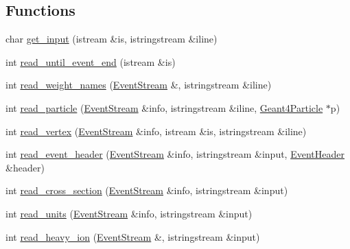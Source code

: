\subsection*{Functions}
\begin{DoxyCompactItemize}
\item 
char \hyperlink{namespace_d_d4hep_1_1_simulation_1_1_hep_m_c_ae12e8ca37b7071f67c1810fa9420acad}{get\_\-input} (istream \&is, istringstream \&iline)
\item 
int \hyperlink{namespace_d_d4hep_1_1_simulation_1_1_hep_m_c_a433e938fb3dfef8ae2590fa16cdb2229}{read\_\-until\_\-event\_\-end} (istream \&is)
\item 
int \hyperlink{namespace_d_d4hep_1_1_simulation_1_1_hep_m_c_a9a0a541fc8f48d5f9b80131b7f3b7e88}{read\_\-weight\_\-names} (\hyperlink{class_d_d4hep_1_1_simulation_1_1_hep_m_c_1_1_event_stream}{EventStream} \&, istringstream \&iline)
\item 
int \hyperlink{namespace_d_d4hep_1_1_simulation_1_1_hep_m_c_ab38b9307ace39b3227306e907c3f6840}{read\_\-particle} (\hyperlink{class_d_d4hep_1_1_simulation_1_1_hep_m_c_1_1_event_stream}{EventStream} \&info, istringstream \&iline, \hyperlink{class_d_d4hep_1_1_simulation_1_1_geant4_particle}{Geant4Particle} $\ast$p)
\item 
int \hyperlink{namespace_d_d4hep_1_1_simulation_1_1_hep_m_c_a05115a3e0b60dbe2ee86c5094cdd16bc}{read\_\-vertex} (\hyperlink{class_d_d4hep_1_1_simulation_1_1_hep_m_c_1_1_event_stream}{EventStream} \&info, istream \&is, istringstream \&iline)
\item 
int \hyperlink{namespace_d_d4hep_1_1_simulation_1_1_hep_m_c_aff50680cc4089a0f2c3b7a0218b3ed2e}{read\_\-event\_\-header} (\hyperlink{class_d_d4hep_1_1_simulation_1_1_hep_m_c_1_1_event_stream}{EventStream} \&info, istringstream \&input, \hyperlink{class_d_d4hep_1_1_simulation_1_1_hep_m_c_1_1_event_header}{EventHeader} \&header)
\item 
int \hyperlink{namespace_d_d4hep_1_1_simulation_1_1_hep_m_c_a873025dee0b6f8a5ce8bd3485e518213}{read\_\-cross\_\-section} (\hyperlink{class_d_d4hep_1_1_simulation_1_1_hep_m_c_1_1_event_stream}{EventStream} \&info, istringstream \&input)
\item 
int \hyperlink{namespace_d_d4hep_1_1_simulation_1_1_hep_m_c_a35bd1c93d31d755bf0b911399c90c789}{read\_\-units} (\hyperlink{class_d_d4hep_1_1_simulation_1_1_hep_m_c_1_1_event_stream}{EventStream} \&info, istringstream \&input)
\item 
int \hyperlink{namespace_d_d4hep_1_1_simulation_1_1_hep_m_c_a973a0fe661658598d3982e072e11f77d}{read\_\-heavy\_\-ion} (\hyperlink{class_d_d4hep_1_1_simulation_1_1_hep_m_c_1_1_event_stream}{EventStream} \&, istringstream \&input)

\end{DoxyCompactItemize}
